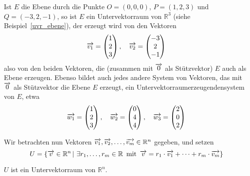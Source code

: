 \begin{beispiel}\label{uvr_ebene_bsp} 
Ist $E$ die Ebene durch die Punkte $O = (0, 0, 0)$, $P = (1,2,3)$ und $Q = (-3,2,-1)$, so ist 
$E$ ein Untervektorraum von $\mathbb R^3$ (siehe Beispiel~\ref{uvr_ebene}), der erzeugt wird von den Vektoren
  	$$ \overrightarrow{v_1} = \left( \begin{matrix} 1 \\ 2 \\ 3  \end{matrix} \right), \quad  
  	\overrightarrow{v_2} = \left( \begin{matrix} -3 \\ 2 \\ -1  \end{matrix} \right) $$
also von den beiden Vektoren, die (zusammen mit $\overrightarrow{0}$ als Stützvektor) $E$ auch als Ebene 
erzeugen. Ebenso bildet auch jedes andere System von Vektoren, das mit $\overrightarrow{0}$ als Stützvektor die 
Ebene $E$ erzeugt, ein Untervektorraumerzeugendensystem von $E$, etwa
  	$$ \overrightarrow{w_1} = \left( \begin{matrix} 1 \\ 2 \\ 3 \end{matrix} \right), \quad  
    	\overrightarrow{w_2} = \left( \begin{matrix} 0 \\ 4 \\ 4  \end{matrix} \right), \quad 
     	\overrightarrow{w_3} = \left( \begin{matrix} 	2 \\ 0 \\ 2  \end{matrix} \right) $$
\end{beispiel}

\medbreak

Wir betrachten nun Vektoren $\overrightarrow{v_1}, \overrightarrow{v_2}, \ldots, 
\overrightarrow{v_m} \in \mathbb R^n$ gegeben, und setzen
  	$$ U = \{ \overrightarrow{v} \in \mathbb R^n \, \vert \, \, \exists r_1, \ldots, r_m \in 
	\mathbb R \, \textrm{ mit } \,
   	\overrightarrow{v} = r_1 \cdot \overrightarrow{v_1} + \cdots + r_m \cdot \overrightarrow{v_m} \} $$

\begin{satz} $U$ ist ein Untervektorraum von $\mathbb R^n$.
\end{satz}


